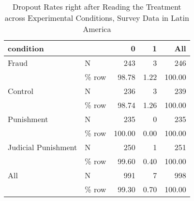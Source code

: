 \begin{table}

\caption{Dropout Rates right after Reading the Treatment across Experimental Conditions,
Survey Data in Latin America}
\centering
\begin{tabular}[t]{llrrr}
\toprule
condition &   & 0 & 1 & All\\
\midrule
Fraud & N & 243 & 3 & 246\\
 & \% row & \num{98.78} & \num{1.22} & \num{100.00}\\
Control & N & 236 & 3 & 239\\
 & \% row & \num{98.74} & \num{1.26} & \num{100.00}\\
Punishment & N & 235 & 0 & 235\\
 & \% row & \num{100.00} & \num{0.00} & \num{100.00}\\
Judicial Punishment & N & 250 & 1 & 251\\
 & \% row & \num{99.60} & \num{0.40} & \num{100.00}\\
All & N & 991 & 7 & 998\\
 & \% row & \num{99.30} & \num{0.70} & \num{100.00}\\
\bottomrule
\end{tabular}
\end{table}
